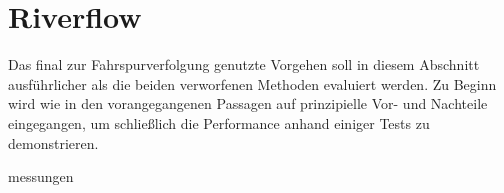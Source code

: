 \section{Riverflow \dcsecondauthorshort}
Das final zur Fahrspurverfolgung genutzte Vorgehen soll in diesem Abschnitt ausführlicher als die beiden verworfenen Methoden evaluiert werden. Zu Beginn wird wie in den vorangegangenen Passagen auf prinzipielle Vor- und Nachteile eingegangen, um schließlich die Performance anhand einiger Tests zu demonstrieren.


{messungen}